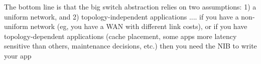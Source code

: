 The bottom line is that the big switch abstraction relies on two assumptions: 1) a uniform network, and 2) topology-independent applications .... if you have a non-uniform network (eg, you have a WAN with different link costs), or if you have topology-dependent applications (cache placement, some apps more latency sensitive than others, maintenance decisions, etc.) then you need the NIB to write your app
